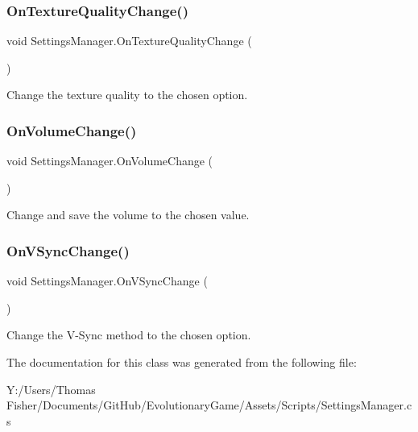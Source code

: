\subsubsection{\texorpdfstring{On\+Texture\+Quality\+Change()}{OnTextureQualityChange()}}
{\footnotesize\ttfamily void Settings\+Manager.\+On\+Texture\+Quality\+Change (\begin{DoxyParamCaption}{ }\end{DoxyParamCaption})}



Change the texture quality to the chosen option. 

\mbox{\label{class_settings_manager_a6d25a3155a5df19d54cfd1cb166fb4f7}} 
\subsubsection{\texorpdfstring{On\+Volume\+Change()}{OnVolumeChange()}}
{\footnotesize\ttfamily void Settings\+Manager.\+On\+Volume\+Change (\begin{DoxyParamCaption}{ }\end{DoxyParamCaption})}



Change and save the volume to the chosen value. 

\mbox{\label{class_settings_manager_aba04234da5db424bda53e733270e8d35}} 
\subsubsection{\texorpdfstring{On\+V\+Sync\+Change()}{OnVSyncChange()}}
{\footnotesize\ttfamily void Settings\+Manager.\+On\+V\+Sync\+Change (\begin{DoxyParamCaption}{ }\end{DoxyParamCaption})}



Change the V-\/\+Sync method to the chosen option. 



The documentation for this class was generated from the following file\+:\begin{DoxyCompactItemize}
\item 
Y\+:/\+Users/\+Thomas Fisher/\+Documents/\+Git\+Hub/\+Evolutionary\+Game/\+Assets/\+Scripts/Settings\+Manager.\+cs\end{DoxyCompactItemize}
